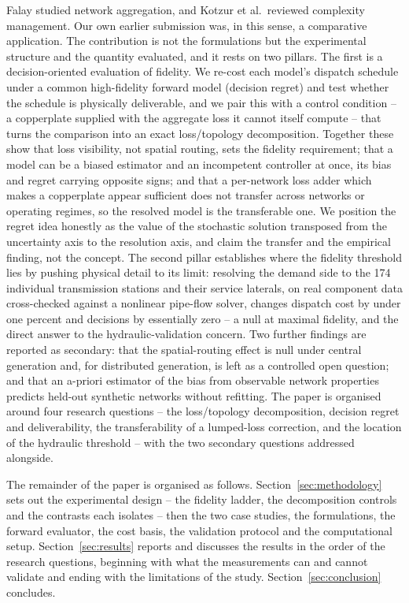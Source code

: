 \documentclass[a4paper,fleqn]{cas-dc}
\begin{document}
Falay studied network aggregation, and Kotzur et al.\ reviewed complexity management. Our
own earlier submission was, in this sense, a comparative application. The contribution is
not the formulations but the experimental structure and the quantity evaluated, and it
rests on two pillars. The first is a decision-oriented evaluation of fidelity. We re-cost
each model's dispatch schedule under a common high-fidelity forward model (decision regret)
and test whether the schedule is physically deliverable, and we pair this with a control
condition -- a copperplate supplied with the aggregate loss it cannot itself compute --
that turns the comparison into an exact loss/topology decomposition. Together these show
that loss visibility, not spatial routing, sets the fidelity requirement; that a model can
be a biased estimator and an incompetent controller at once, its bias and regret carrying
opposite signs; and that a per-network loss adder which makes a copperplate appear
sufficient does not transfer across networks or operating regimes, so the resolved model is
the transferable one. We position the regret idea honestly as the value of the stochastic
solution transposed from the uncertainty axis to the resolution axis, and claim the transfer
and the empirical finding, not the concept. The second pillar establishes where the fidelity
threshold lies by pushing physical detail to its limit: resolving the demand side to the 174
individual transmission stations and their service laterals, on real component data
cross-checked against a nonlinear pipe-flow solver, changes dispatch cost by under one
percent and decisions by essentially zero -- a null at maximal fidelity, and the direct
answer to the hydraulic-validation concern. Two further findings are reported as secondary:
that the spatial-routing effect is null under central generation and, for distributed
generation, is left as a controlled open question; and that an a-priori estimator of the
bias from observable network properties predicts held-out synthetic networks without
refitting. The paper is organised around four research questions -- the loss/topology
decomposition, decision regret and deliverability, the transferability of a lumped-loss
correction, and the location of the hydraulic threshold -- with the two secondary questions
addressed alongside.

The remainder of the paper is organised as follows.
Section~\ref{sec:methodology} sets out the experimental design -- the fidelity ladder, the
decomposition controls and the contrasts each isolates -- then the two case studies, the
formulations, the forward evaluator, the cost basis, the validation protocol and the
computational setup. Section~\ref{sec:results} reports and discusses the results in the
order of the research questions, beginning with what the measurements can and cannot
validate and ending with the limitations of the study.
Section~\ref{sec:conclusion} concludes.
\end{document}
